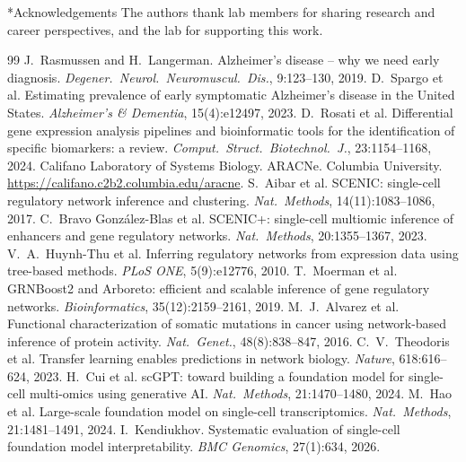 \documentclass[10pt,twocolumn,letterpaper]{article}
\makeatletter
\renewcommand\section{\@startsection{section}{1}{\z@}{-1.6ex plus -.4ex minus -.2ex}{0.8ex plus .2ex}{\normalfont\large\bfseries}}
\makeatother
\begin{document}
\section*{Acknowledgements}
The authors thank lab members for sharing research and career perspectives, and the lab for supporting this work.


{\small
\begin{thebibliography}{99}\setlength{\itemsep}{0pt}
 J.~Rasmussen and H.~Langerman. Alzheimer's disease -- why we need early diagnosis. \emph{Degener.\ Neurol.\ Neuromuscul.\ Dis.}, 9:123--130, 2019.
 D.~Spargo et al. Estimating prevalence of early symptomatic Alzheimer's disease in the United States. \emph{Alzheimer's \& Dementia}, 15(4):e12497, 2023.
 D.~Rosati et al. Differential gene expression analysis pipelines and bioinformatic tools for the identification of specific biomarkers: a review. \emph{Comput.\ Struct.\ Biotechnol.\ J.}, 23:1154--1168, 2024.
 Califano Laboratory of Systems Biology. ARACNe. Columbia University. \url{https://califano.c2b2.columbia.edu/aracne}.
 S.~Aibar et al. SCENIC: single-cell regulatory network inference and clustering. \emph{Nat.\ Methods}, 14(11):1083--1086, 2017.
 C.~Bravo Gonz\'alez-Blas et al. SCENIC+: single-cell multiomic inference of enhancers and gene regulatory networks. \emph{Nat.\ Methods}, 20:1355--1367, 2023.
 V.~A.~Huynh-Thu et al. Inferring regulatory networks from expression data using tree-based methods. \emph{PLoS ONE}, 5(9):e12776, 2010.
 T.~Moerman et al. GRNBoost2 and Arboreto: efficient and scalable inference of gene regulatory networks. \emph{Bioinformatics}, 35(12):2159--2161, 2019.
 M.~J.~Alvarez et al. Functional characterization of somatic mutations in cancer using network-based inference of protein activity. \emph{Nat.\ Genet.}, 48(8):838--847, 2016.
 C.~V.~Theodoris et al. Transfer learning enables predictions in network biology. \emph{Nature}, 618:616--624, 2023.
 H.~Cui et al. scGPT: toward building a foundation model for single-cell multi-omics using generative AI. \emph{Nat.\ Methods}, 21:1470--1480, 2024.
 M.~Hao et al. Large-scale foundation model on single-cell transcriptomics. \emph{Nat.\ Methods}, 21:1481--1491, 2024.
 I.~Kendiukhov. Systematic evaluation of single-cell foundation model interpretability. \emph{BMC Genomics}, 27(1):634, 2026.

\end{thebibliography}}
\end{document}
